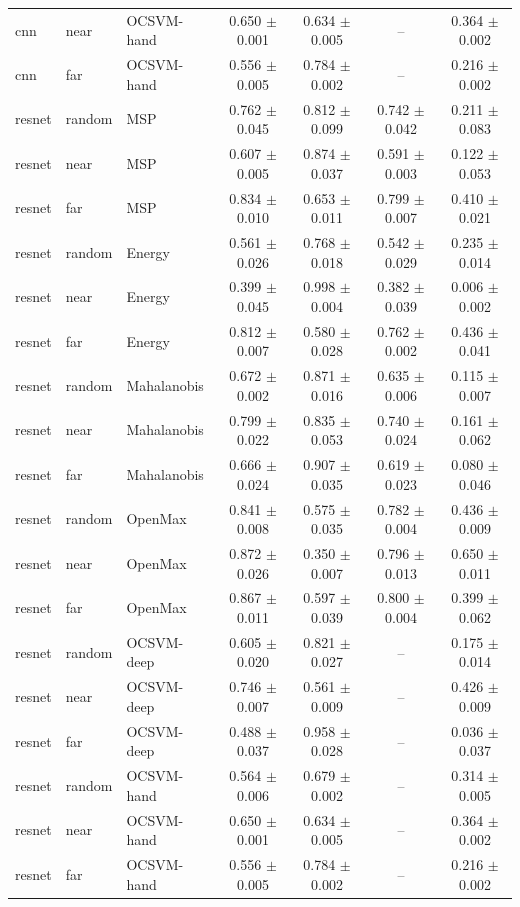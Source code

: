 \begin{table}[t]
{\begin{tabular}{lllcccc}
cnn & near & OCSVM-hand & 0.650 $\pm$ 0.001 & 0.634 $\pm$ 0.005 & -- & 0.364 $\pm$ 0.002 \\
cnn & far & OCSVM-hand & 0.556 $\pm$ 0.005 & 0.784 $\pm$ 0.002 & -- & 0.216 $\pm$ 0.002 \\
resnet & random & MSP & 0.762 $\pm$ 0.045 & 0.812 $\pm$ 0.099 & 0.742 $\pm$ 0.042 & 0.211 $\pm$ 0.083 \\
resnet & near & MSP & 0.607 $\pm$ 0.005 & 0.874 $\pm$ 0.037 & 0.591 $\pm$ 0.003 & 0.122 $\pm$ 0.053 \\
resnet & far & MSP & 0.834 $\pm$ 0.010 & 0.653 $\pm$ 0.011 & 0.799 $\pm$ 0.007 & 0.410 $\pm$ 0.021 \\
resnet & random & Energy & 0.561 $\pm$ 0.026 & 0.768 $\pm$ 0.018 & 0.542 $\pm$ 0.029 & 0.235 $\pm$ 0.014 \\
resnet & near & Energy & 0.399 $\pm$ 0.045 & 0.998 $\pm$ 0.004 & 0.382 $\pm$ 0.039 & 0.006 $\pm$ 0.002 \\
resnet & far & Energy & 0.812 $\pm$ 0.007 & 0.580 $\pm$ 0.028 & 0.762 $\pm$ 0.002 & 0.436 $\pm$ 0.041 \\
resnet & random & Mahalanobis & 0.672 $\pm$ 0.002 & 0.871 $\pm$ 0.016 & 0.635 $\pm$ 0.006 & 0.115 $\pm$ 0.007 \\
resnet & near & Mahalanobis & 0.799 $\pm$ 0.022 & 0.835 $\pm$ 0.053 & 0.740 $\pm$ 0.024 & 0.161 $\pm$ 0.062 \\
resnet & far & Mahalanobis & 0.666 $\pm$ 0.024 & 0.907 $\pm$ 0.035 & 0.619 $\pm$ 0.023 & 0.080 $\pm$ 0.046 \\
resnet & random & OpenMax & 0.841 $\pm$ 0.008 & 0.575 $\pm$ 0.035 & 0.782 $\pm$ 0.004 & 0.436 $\pm$ 0.009 \\
resnet & near & OpenMax & 0.872 $\pm$ 0.026 & 0.350 $\pm$ 0.007 & 0.796 $\pm$ 0.013 & 0.650 $\pm$ 0.011 \\
resnet & far & OpenMax & 0.867 $\pm$ 0.011 & 0.597 $\pm$ 0.039 & 0.800 $\pm$ 0.004 & 0.399 $\pm$ 0.062 \\
resnet & random & OCSVM-deep & 0.605 $\pm$ 0.020 & 0.821 $\pm$ 0.027 & -- & 0.175 $\pm$ 0.014 \\
resnet & near & OCSVM-deep & 0.746 $\pm$ 0.007 & 0.561 $\pm$ 0.009 & -- & 0.426 $\pm$ 0.009 \\
resnet & far & OCSVM-deep & 0.488 $\pm$ 0.037 & 0.958 $\pm$ 0.028 & -- & 0.036 $\pm$ 0.037 \\
resnet & random & OCSVM-hand & 0.564 $\pm$ 0.006 & 0.679 $\pm$ 0.002 & -- & 0.314 $\pm$ 0.005 \\
resnet & near & OCSVM-hand & 0.650 $\pm$ 0.001 & 0.634 $\pm$ 0.005 & -- & 0.364 $\pm$ 0.002 \\
resnet & far & OCSVM-hand & 0.556 $\pm$ 0.005 & 0.784 $\pm$ 0.002 & -- & 0.216 $\pm$ 0.002 \\
\bottomrule
\end{tabular}}
\end{table}